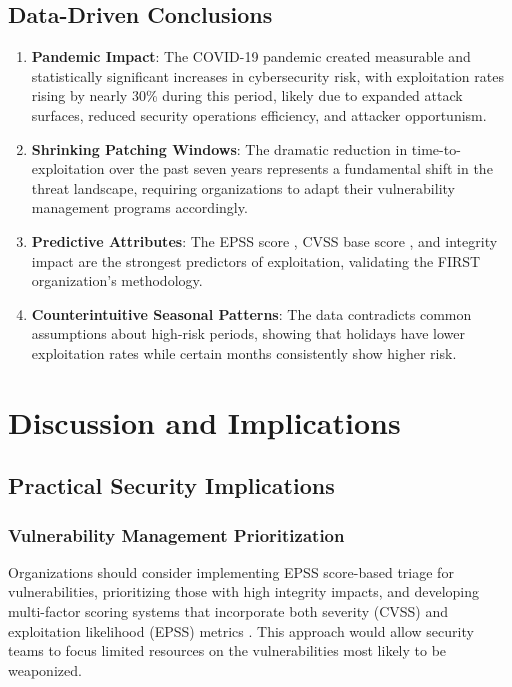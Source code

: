 \documentclass[runningheads]{llncs}
\begin{document}
\subsection{Data-Driven Conclusions}

\begin{enumerate}
    \item \textbf{Pandemic Impact}: The COVID-19 pandemic created measurable and statistically significant increases in cybersecurity risk, with exploitation rates rising by nearly 30\% during this period, likely due to expanded attack surfaces, reduced security operations efficiency, and attacker opportunism.
    
    \item \textbf{Shrinking Patching Windows}: The dramatic reduction in time-to-exploitation over the past seven years represents a fundamental shift in the threat landscape, requiring organizations to adapt their vulnerability management programs accordingly.
    
    \item \textbf{Predictive Attributes}: The EPSS score \cite{jacobs2019exploit}, CVSS base score \cite{cvss_framework}, and integrity impact are the strongest predictors of exploitation, validating the FIRST organization's methodology.
    
    \item \textbf{Counterintuitive Seasonal Patterns}: The data contradicts common assumptions about high-risk periods, showing that holidays have lower exploitation rates while certain months consistently show higher risk.
\end{enumerate}

\section{Discussion and Implications}
\label{sec:discussion}

\subsection{Practical Security Implications}

\subsubsection{Vulnerability Management Prioritization}
Organizations should consider implementing EPSS score-based triage for vulnerabilities, prioritizing those with high integrity impacts, and developing multi-factor scoring systems that incorporate both severity (CVSS) and exploitation likelihood (EPSS) metrics \cite{seiersen2017practical}. This approach would allow security teams to focus limited resources on the vulnerabilities most likely to be weaponized.
\end{document}
